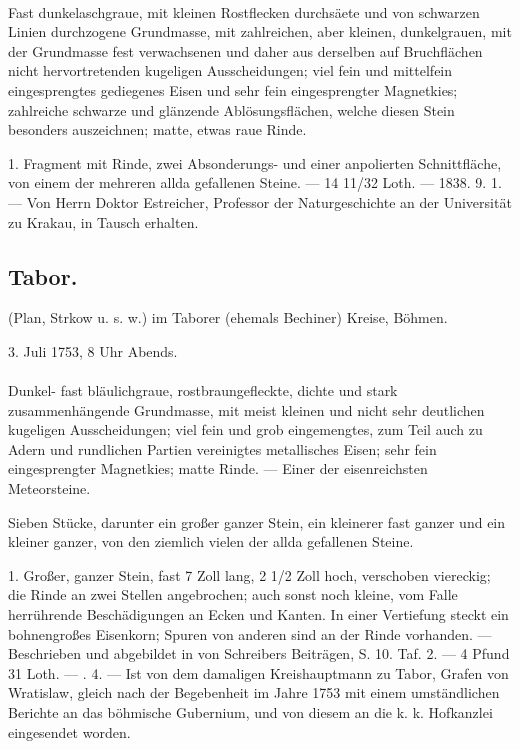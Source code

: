 \documentclass[a4paper, 11pt, oneside, polutonikogreek, german]{article}
\begin{document}
\paragraph{}
Fast dunkelaschgraue, mit kleinen Rostflecken durchsäete und von schwarzen Linien durchzogene Grundmasse, mit zahlreichen, aber kleinen, dunkelgrauen, mit der Grundmasse fest verwachsenen und daher aus derselben auf Bruchflächen nicht hervortretenden kugeligen Ausscheidungen; viel fein und mittelfein eingesprengtes gediegenes Eisen und sehr fein eingesprengter Magnetkies; zahlreiche schwarze und glänzende Ablösungsflächen, welche diesen Stein besonders auszeichnen; matte, etwas raue Rinde.

1. Fragment mit Rinde, zwei Absonderungs- und einer anpolierten Schnittfläche, von einem der mehreren allda gefallenen Steine. — 14 11/32 Loth. — 1838. 9. 1. — Von Herrn Doktor Estreicher, Professor der Naturgeschichte an der Universität zu Krakau, in Tausch erhalten.
\subsection{Tabor.}
\begin{center}
\small
(Plan, Strkow u. s. w.) im Taborer (ehemals Bechiner) Kreise, Böhmen.

3. Juli 1753, 8 Uhr Abends.
\end{center}
\paragraph{}
Dunkel- fast bläulichgraue, rostbraungefleckte, dichte und stark zusammenhängende Grundmasse, mit meist kleinen und nicht sehr deutlichen kugeligen Ausscheidungen; viel fein und grob eingemengtes, zum Teil auch zu Adern und rundlichen Partien vereinigtes metallisches Eisen; sehr fein eingesprengter Magnetkies; matte Rinde. — Einer der eisenreichsten Meteorsteine.

Sieben Stücke, darunter ein großer ganzer Stein, ein kleinerer fast ganzer und ein kleiner ganzer, von den ziemlich vielen der allda gefallenen Steine.

1. Großer, ganzer Stein, fast 7 Zoll lang, 2 1/2 Zoll hoch, verschoben viereckig; die Rinde an zwei Stellen angebrochen; auch sonst noch kleine, vom Falle herrührende Beschädigungen an Ecken und Kanten. In einer Vertiefung steckt ein bohnengroßes Eisenkorn; Spuren von anderen sind an der Rinde vorhanden. — Beschrieben und abgebildet in von Schreibers Beiträgen, S. 10. Taf. 2. — 4 Pfund 31 Loth. — . 4. — Ist von dem damaligen Kreishauptmann zu Tabor, Grafen von Wratislaw, gleich nach der Begebenheit im Jahre 1753 mit einem umständlichen Berichte an das böhmische Gubernium, und von diesem an die k. k. Hofkanzlei eingesendet worden.
\end{document}
